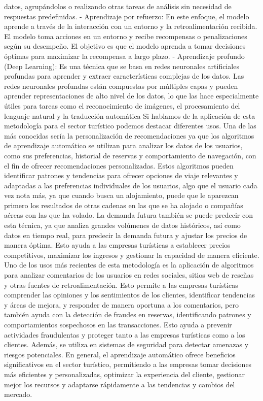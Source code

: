 \documentclass[
  letterpaper,
  DIV=11,
  numbers=noendperiod]{scrreprt}
\begin{document}
datos, agrupándolos o realizando otras tareas de análisis sin necesidad
de respuestas predefinidas. - Aprendizaje por refuerzo: En este enfoque,
el modelo aprende a través de la interacción con un entorno y la
retroalimentación recibida. El modelo toma acciones en un entorno y
recibe recompensas o penalizaciones según su desempeño. El objetivo es
que el modelo aprenda a tomar decisiones óptimas para maximizar la
recompensa a largo plazo. - Aprendizaje profundo (Deep Learning): Es una
técnica que se basa en redes neuronales artificiales profundas para
aprender y extraer características complejas de los datos. Las redes
neuronales profundas están compuestas por múltiples capas y pueden
aprender representaciones de alto nivel de los datos, lo que las hace
especialmente útiles para tareas como el reconocimiento de imágenes, el
procesamiento del lenguaje natural y la traducción automática Si
hablamos de la aplicación de esta metodología para el sector turístico
podemos destacar diferentes usos. Una de las más conocidas sería la
personalización de recomendaciones ya que los algoritmos de aprendizaje
automático se utilizan para analizar los datos de los usuarios, como sus
preferencias, historial de reservas y comportamiento de navegación, con
el fin de ofrecer recomendaciones personalizadas. Estos algoritmos
pueden identificar patrones y tendencias para ofrecer opciones de viaje
relevantes y adaptadas a las preferencias individuales de los usuarios,
algo que el usuario cada vez nota más, ya que cuando busca un
alojamiento, puede que le aparezcan primero los resultados de otras
cadenas en las que se ha alojado o compañías aéreas con las que ha
volado. La demanda futura también se puede predecir con esta técnica, ya
que analiza grandes volúmenes de datos históricos, así como datos en
tiempo real, para predecir la demanda futura y ajustar los precios de
manera óptima. Esto ayuda a las empresas turísticas a establecer precios
competitivos, maximizar los ingresos y gestionar la capacidad de manera
eficiente. Uno de los usos más recientes de esta metodología es la
aplicación de algoritmos para analizar comentarios de los usuarios en
redes sociales, sitios web de reseñas y otras fuentes de
retroalimentación. Esto permite a las empresas turísticas comprender las
opiniones y los sentimientos de los clientes, identificar tendencias y
áreas de mejora, y responder de manera oportuna a los comentarios, pero
también ayuda con la detección de fraudes en reservas, identificando
patrones y comportamientos sospechosos en las transacciones. Esto ayuda
a prevenir actividades fraudulentas y proteger tanto a las empresas
turísticas como a los clientes. Además, se utiliza en sistemas de
seguridad para detectar amenazas y riesgos potenciales. En general, el
aprendizaje automático ofrece beneficios significativos en el sector
turístico, permitiendo a las empresas tomar decisiones más eficientes y
personalizadas, optimizar la experiencia del cliente, gestionar mejor
los recursos y adaptarse rápidamente a las tendencias y cambios del
mercado.
\end{document}
